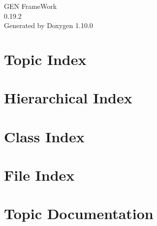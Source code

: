\documentclass[twoside]{book}
\newcommand{\+}{\discretionary{\mbox{\scriptsize$\hookleftarrow$}}{}{}}
\newcommand{\clearemptydoublepage}{%
    \newpage{\pagestyle{empty}\cleardoublepage}%
  }
\begin{document}
  \raggedbottom
    \hypersetup{pageanchor=false,
                bookmarksnumbered=true,
                pdfencoding=unicode
               }
  \begin{titlepage}
  \vspace*{7cm}
  \begin{center}%
  {\Large GEN Frame\+Work}\\
  [1ex]\large 0.\+19.\+2 \\
  \vspace*{1cm}
  {\large Generated by Doxygen 1.10.0}\\
  \end{center}
  \end{titlepage}
  \clearemptydoublepage
  \tableofcontents
  \clearemptydoublepage
  \hypersetup{pageanchor=true}

\chapter{Topic Index}

\chapter{Hierarchical Index}

\chapter{Class Index}

\chapter{File Index}

\chapter{Topic Documentation}




















\end{document}
